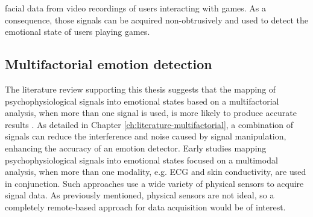 facial data from video recordings of users interacting with games. As a consequence, those signals can be acquired non-obtrusively and used to detect the emotional state of users playing games.



\subsection{Multifactorial emotion detection}

The literature review supporting this thesis suggests that the mapping of psychophysiological signals into emotional states based on a multifactorial analysis, when more than one signal is used, is more likely to produce accurate results \parencite{kukolja2014comparative}. As detailed in Chapter \ref{ch:literature-multifactorial}, a combination of signals can reduce the interference and noise caused by signal manipulation, enhancing the accuracy of an emotion detector. Early studies mapping psychophysiological signals into emotional states focused on a multimodal analysis, when more than one modality, e.g. ECG and skin conductivity, are used in conjunction. Such approaches use a wide variety of physical sensors to acquire signal data. As previously mentioned, physical sensors are not ideal, so a completely remote-based approach for data acquisition would be of interest.

